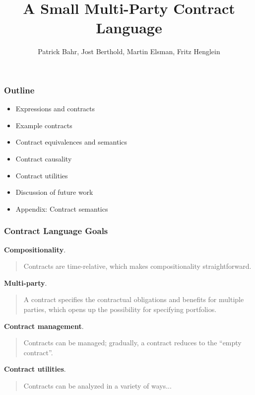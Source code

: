 \documentclass[xcolor=dvipsnames,11pt]{beamer}
\title{A Small Multi-Party Contract Language}
\author[Bahr,Berthold,Elsman,Henglein]{Patrick Bahr, Jost Berthold, Martin Elsman, Fritz Henglein}
\begin{document}
\frame[plain]{\titlepage}

\begin{frame}[fragile,t]
    \frametitle{Outline}

\begin{itemize}
\item Expressions and contracts
\item Example contracts
\item Contract equivalences and semantics
\item Contract causality
\item Contract utilities
\item Discussion of future work\\
\item Appendix: Contract semantics
\end{itemize}
\end{frame}

\begin{frame}[fragile,t]
    \frametitle{Contract Language Goals}

\textbf{Compositionality}. 
\begin{quote}
Contracts are time-relative, which makes compositionality
straightforward.
\end{quote}

\textbf{Multi-party}.
\begin{quote}
A contract specifies the contractual obligations and benefits for
multiple parties, which opens up the possibility for specifying
portfolios.
\end{quote}

\textbf{Contract management}.
\begin{quote}
Contracts can be managed; gradually, a contract reduces to the ``empty
contract''.
\end{quote}

\textbf{Contract utilities}.
\begin{quote}
Contracts can be analyzed in a variety of ways...
\end{quote}

\end{frame} 
\end{document}
